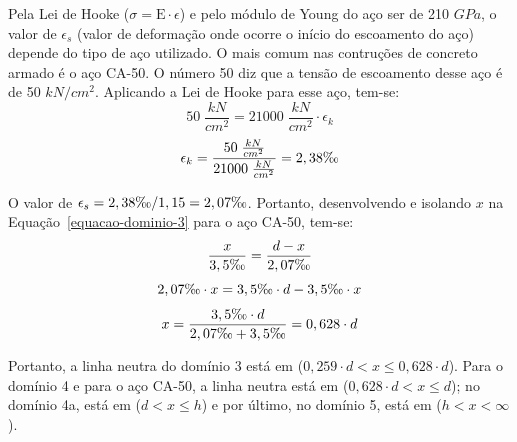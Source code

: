 Pela Lei de Hooke ($\sigma=\text{E}\cdot\epsilon$) e pelo módulo de Young do aço ser de 210 $GPa$, o valor de $\epsilon_s$ (valor de deformação onde ocorre o início do escoamento do aço) depende do tipo de aço utilizado. O mais comum nas contruções de concreto armado é o aço CA-50. O número 50 diz que a tensão de escoamento desse aço é de 50 $kN/{cm}^2$. Aplicando a Lei de Hooke para esse aço, tem-se:
$$50\;\frac{kN}{{cm}^2}=21000\;\frac{kN}{{cm}^2}\cdot\epsilon_k$$
$$\epsilon_k=\frac{50\;\frac{kN}{{cm}^2}}{21000\;\frac{kN}{{cm}^2}}=2,38\text{\textperthousand}$$

O valor de $\epsilon_s=2,38\text{\textperthousand}/1,15=2,07\text{\textperthousand}$. Portanto, desenvolvendo e isolando $x$ na Equação~\eqref{equacao-dominio-3} para o aço CA-50, tem-se:
$$\frac{x}{3,5\text{\textperthousand}}=\frac{d-x}{2,07\text{\textperthousand}}$$
$$2,07\text{\textperthousand}\cdot x=3,5\text{\textperthousand}\cdot d-3,5\text{\textperthousand}\cdot x$$
$$x=\frac{3,5\text{\textperthousand}\cdot d}{2,07\text{\textperthousand}+3,5\text{\textperthousand}}=0,628\cdot d$$

Portanto, a linha neutra do domínio 3 está em ($0,259\cdot d<x\leqslant0,628\cdot d$). Para o domínio 4 e para o aço CA-50, a linha neutra está em ($0,628\cdot d<x\leqslant d$); no domínio 4a, está em ($d<x\leqslant h$) e por último, no domínio 5, está em ($h<x<\infty$).
